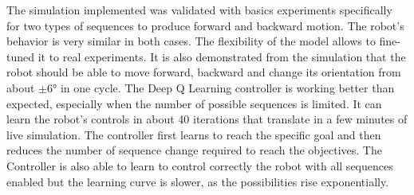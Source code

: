     The simulation implemented was validated with basics experiments specifically for two types of sequences to produce forward and backward motion. The robot's behavior is very similar in both cases. The flexibility of the model allows to fine-tuned it to real experiments. It is also demonstrated from the simulation that the robot should be able to move forward, backward and change its orientation from about $\pm 6$° in one cycle. The Deep Q Learning controller is working better than expected, especially when the number of possible sequences is limited. It can learn the robot's controls in about 40 iterations that translate in a few minutes of live simulation. The controller first learns to reach the specific goal and then reduces the number of sequence change required to reach the objectives. The Controller is also able to learn to control correctly the robot with all sequences enabled but the learning curve is slower, as the possibilities rise exponentially.